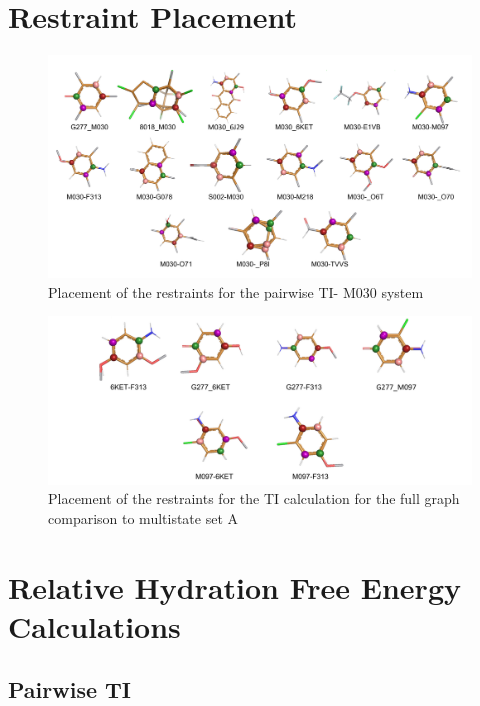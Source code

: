 \section{Restraint Placement}
\begin{figure}
    \centering
    \includegraphics[width=\textwidth]{fig/results/pairwise/restraintPlacement/Restraints_PairwiseTI_M030Graph.png}
    \caption{Placement of the restraints for the pairwise TI- M030 system}
    \label{SIfig: Pairwise_TI_M030_Graph}
\end{figure}

\begin{figure}
    \centering
    \includegraphics[width=\textwidth]{fig/results/pairwise/restraintPlacement/Restraints_PairwiseTI_reedsaddition.png}
    \caption{Placement of the restraints for the TI calculation for the full graph comparison to multistate set A}
    \label{SIfig:Pairwise_TI_AddRE-EDS_Graph}
\end{figure}

\clearpage

\section{Relative Hydration Free Energy Calculations}
\subsection{Pairwise TI}

